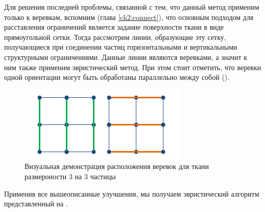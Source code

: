 	Для решения последней проблемы, связанной с тем, что данный метод применим только к веревкам, вспомним (глава \ref{ch2:connect}), что основным подходом для расставления ограничений является задание поверхности ткани в виде прямоугольной сетки. Тогда рассмотрим линии, образующие эту сетку, получающиеся при соединении частиц горизонтальными и вертикальными структурными ограничениями. Данные линии являются веревками, а значит к ним также применим эвристический метод. При этом стоит отметить, что веревки одной ориентации могут быть обработаны параллельно между собой ().
	
	\begin{figure}[ht!] 
		\center
		\includegraphics [scale=0.8] {my_folder/images//bending}
		\caption{Визуальная демонстрация расположения веревок для ткани размероности 3 на 3 частицы}
		\label{fig:ropesInCloth}  
	\end{figure}
	
	Применив все вышеописанные улучшения, мы получаем эвристический алгоритм представленный на .
	
